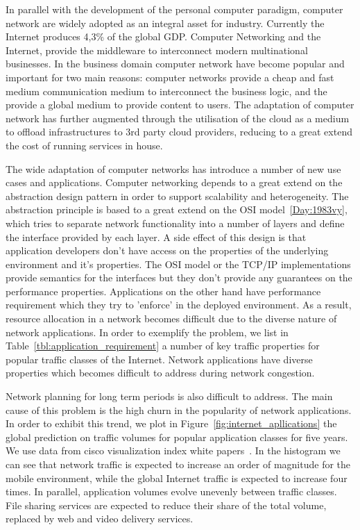 In parallel with the development of the personal computer paradigm, computer
network are widely adopted as an integral asset for industry.  Currently the
Internet produces 4,3\% of the global GDP. Computer Networking and the Internet,
provide the middleware to interconnect modern multinational businesses. In the
business domain computer network have become popular and important for two main
reasons: computer networks provide a cheap and fast medium communication medium
to interconnect the business logic, and the provide a global medium to provide
content to users. The adaptation of computer network has further augmented
through the utilisation of the cloud as a medium to offload infrastructures to
3rd party cloud providers, reducing to a great extend the cost of running
services in house.

The wide adaptation of computer networks has introduce a number of new use cases
and applications. Computer networking depends to a great extend on the
abstraction design pattern in order to support scalability and heterogeneity.
The abstraction principle is based to a great extend on the OSI
model~\ref{Day:1983vy}, which tries to separate network functionality into a
number of layers and define the interface provided by each layer. A side effect
of this design is that application developers don't have access on the
properties of the underlying environment and it's properties.  The OSI model or
the TCP/IP implementations provide semantics for the interfaces but they don't
provide any guarantees on the performance properties.  Applications on the other
hand have performance requirement which they try to 'enforce' in the deployed
environment. As a result, resource allocation in a network becomes difficult due
to the diverse nature of network applications. In order to exemplify the problem, 
we list in Table~\ref{tbl:application_requirement} a number of key traffic properties 
for popular traffic classes of the Internet. Network applications have
diverse properties which becomes difficult to address during network congestion. 

Network planning for long term periods is also difficult to address.  The main
cause of this problem is the high churn in the  popularity of network
applications.  In order to exhibit this trend, we plot in
Figure~\ref{fig:internet_apllications} the global prediction on traffic volumes
for popular application classes for five years. We use data from cisco
visualization index white papers~\cite{Mobile:2012vd,Cisco:2012wu}. In the
histogram we can see that network traffic is expected to increase an order of
magnitude for the mobile environment, while the global Internet traffic is
expected to increase four times. In parallel, application volumes evolve
unevenly between traffic classes. File sharing services are expected to reduce
their share of the total volume, replaced by web and video delivery services. 

